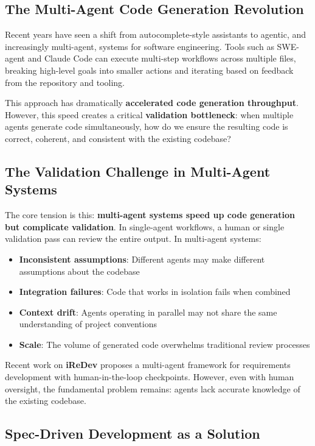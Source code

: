 \documentclass[sigconf,anonymous,review]{acmart}
\begin{document}
\subsection{The Multi-Agent Code Generation Revolution}

Recent years have seen a shift from autocomplete-style assistants to agentic, and increasingly multi-agent, systems for software engineering. Tools such as SWE-agent and Claude Code can execute multi-step workflows across multiple files, breaking high-level goals into smaller actions and iterating based on feedback from the repository and tooling.

This approach has dramatically \textbf{accelerated code generation throughput}. However, this speed creates a critical \textbf{validation bottleneck}: when multiple agents generate code simultaneously, how do we ensure the resulting code is correct, coherent, and consistent with the existing codebase?

\subsection{The Validation Challenge in Multi-Agent Systems}

The core tension is this: \textbf{multi-agent systems speed up code generation but complicate validation}. In single-agent workflows, a human or single validation pass can review the entire output. In multi-agent systems:

\begin{itemize}
  \item \textbf{Inconsistent assumptions}: Different agents may make different assumptions about the codebase
  \item \textbf{Integration failures}: Code that works in isolation fails when combined
  \item \textbf{Context drift}: Agents operating in parallel may not share the same understanding of project conventions
  \item \textbf{Scale}: The volume of generated code overwhelms traditional review processes
\end{itemize}

Recent work on \textbf{iReDev} proposes a multi-agent framework for requirements development with human-in-the-loop checkpoints. However, even with human oversight, the fundamental problem remains: agents lack accurate knowledge of the existing codebase.

\subsection{Spec-Driven Development as a Solution}
\end{document}
